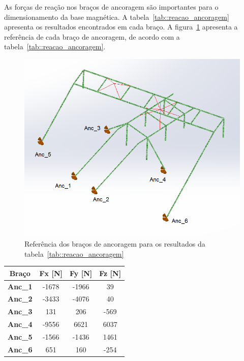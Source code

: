 As forças de reação nos braços de ancoragem são importantes para o
dimensionamento da base magnética. A tabela~\ref{tab::reacao_ancoragem}
apresenta os resultados encontrados em cada braço. A
figura~\ref{fig::mapa_forcas} apresenta a referência de cada braço de
ancoragem, de acordo com a tabela~\ref{tab::reacao_ancoragem}.

\begin{figure}[h!]
	\centering
	\includegraphics[width=0.8\columnwidth]{method/figs/dimensionamento/mapa_forcas}
	\caption{Referência dos braços de ancoragem para os resultados da
	tabela~\ref{tab::reacao_ancoragem}}
    \label{fig::mapa_forcas}
\end{figure}

\begin{center}
\centering
\begin{tabular}{|c|c|c|c|}
\hline
\textbf{Braço}  & \textbf{Fx {[}N{]}} & \textbf{Fy {[}N{]}} & \textbf{Fz {[}N{]}} \\ \hline
\textbf{Anc\_1} & -1678               & -1966               & 39                  \\ \hline
\textbf{Anc\_2} & -3433               & -4076               & 40                  \\ \hline
\textbf{Anc\_3} & 131                 & 206                 & -569                \\ \hline
\textbf{Anc\_4} & -9556               & 6621                & 6037                \\ \hline
\textbf{Anc\_5} & -1566               & -1436               & 1461                \\ \hline
\textbf{Anc\_6} & 651                 & 160                 & -254                \\ \hline
\end{tabular}
\label{tab::reacao_ancoragem}
\end{center}

